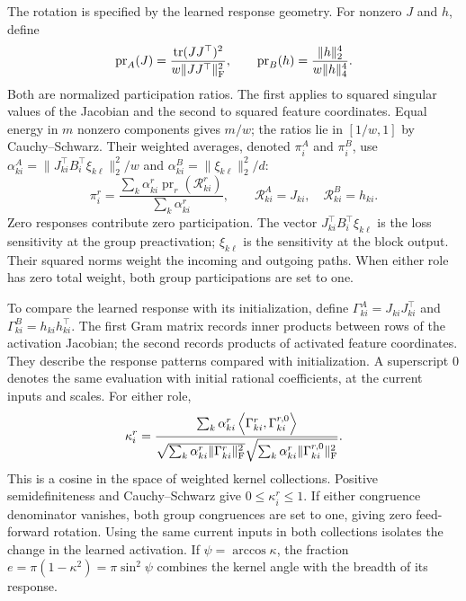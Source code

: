 The rotation is specified by the learned response geometry.
For nonzero $J$ and $h$, define
\begin{equation}
 \operatorname{pr}_A(J)=
 \frac{\operatorname{tr}(JJ^\top)^2}{w\|JJ^\top\|_{\rm F}^2},
 \qquad \operatorname{pr}_B(h)=\frac{\|h\|_2^4}{w\|h\|_4^4}.
 \label{eq:response-summary-components}
\end{equation}
Both are normalized participation ratios. The first applies to squared
singular values of the Jacobian and the second to squared feature
coordinates. Equal energy in $m$ nonzero components gives $m/w$;
the ratios lie in $[1/w,1]$ by Cauchy--Schwarz.
Their weighted averages, denoted $\pi_i^A$ and $\pi_i^B$, use
$\alpha_{ki}^A=\|J_{ki}^\top B_i^\top\xi_{k\ell}\|_2^2/w$
and $\alpha_{ki}^B=\|\xi_{k\ell}\|_2^2/d$:
\begin{equation}
 \pi_i^r=\frac{\sum_k\alpha_{ki}^r\operatorname{pr}_r(\mathcal R_{ki}^r)}
 {\sum_k\alpha_{ki}^r},\qquad
 \mathcal R_{ki}^A=J_{ki},\quad\mathcal R_{ki}^B=h_{ki}.
 \label{eq:participation-main}
\end{equation}
Zero responses contribute zero participation. The vector
$J_{ki}^\top B_i^\top\xi_{k\ell}$ is the loss sensitivity at the
group preactivation; $\xi_{k\ell}$ is the sensitivity at the block
output. Their squared norms weight the incoming and outgoing paths.
When either role has zero total weight, both group participations
are set to one.

To compare the learned response with its initialization, define
$\Gamma_{ki}^A=J_{ki}J_{ki}^\top$ and
$\Gamma_{ki}^B=h_{ki}h_{ki}^\top$.
The first Gram matrix records inner products between rows of the
activation Jacobian; the second records products of activated
feature coordinates. They describe the response patterns compared
with initialization.
A superscript $0$ denotes the same evaluation with initial rational
coefficients, at the current inputs and scales. For either role,
\begin{equation}
 \kappa_i^r=
 \frac{\sum_k\alpha_{ki}^r\left\langle \Gamma_{ki}^r,\Gamma_{ki}^{r,0}\right\rangle}
 {\sqrt{\sum_k\alpha_{ki}^r\|\Gamma_{ki}^r\|_{\rm F}^2}
  \sqrt{\sum_k\alpha_{ki}^r\|\Gamma_{ki}^{r,0}\|_{\rm F}^2}}.
 \label{eq:congruence-main}
\end{equation}
This is a cosine in the space of weighted kernel collections.
Positive semidefiniteness and Cauchy--Schwarz give $0\leq\kappa_i^r\leq1$.
If either congruence denominator vanishes, both group congruences
are set to one, giving zero feed-forward rotation.
Using the same current inputs in both collections isolates the change
in the learned activation. If $\psi=\arccos\kappa$, the fraction
$e=\pi(1-\kappa^2)=\pi\sin^2\psi$ combines the kernel angle with
the breadth of its response.

